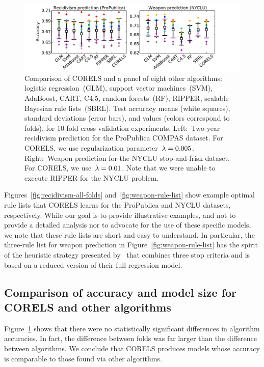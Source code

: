 \begin{figure}[t!]
\begin{center}
\includegraphics[trim={14mm, 5mm, 30mm, 5mm},
width=\textwidth]{figs/compare-compas-weapon.pdf}
\end{center}
\caption{Comparison of CORELS and a panel of eight other algorithms:
logistic regression~(GLM), support vector machines~(SVM),
AdaBoost, CART, C4.5, random forests~(RF), RIPPER,
scalable Bayesian rule lists~(SBRL).
%
Test accuracy means (white squares),
standard deviations (error bars),
and values (colors correspond to folds),
for 10-fold cross-validation experiments.
%
Left:~Two-year recidivism prediction for the ProPublica COMPAS dataset.
%
For CORELS, we use regularization parameter~${{\lambda}=0.005}$.
%
Right:~Weapon prediction for the NYCLU stop-and-frisk dataset.
%
For CORELS, we use~${{\lambda}=0.01}$.
%
Note that we were unable to execute RIPPER for the NYCLU problem.
}
\label{fig:comparison}
\end{figure}

Figures~\ref{fig:recidivism-all-folds} and~\ref{fig:weapon-rule-list}
show example optimal rule lists that CORELS learns
for the ProPublica and NYCLU datasets, respectively.
%
While our goal is to provide illustrative examples, and not to provide a
detailed analysis nor to advocate for the use of these specific models,
we note that these rule lists are short and easy to understand.
%
In particular, the three-rule list for weapon prediction
in Figure~\ref{fig:weapon-rule-list} has the spirit of the heuristic
strategy presented by~\citet{Goel16} that combines three stop criteria
and is based on a reduced version of their full regression model.

\subsection{Comparison of accuracy and model size for CORELS and other algorithms}

Figure~\ref{fig:comparison} shows that there were no statistically significant
differences in algorithm accuracies.
In fact, the difference between folds was far larger than the difference
between algorithms.
We conclude that CORELS produces models whose accuracy is comparable
to those found via other algorithms.

